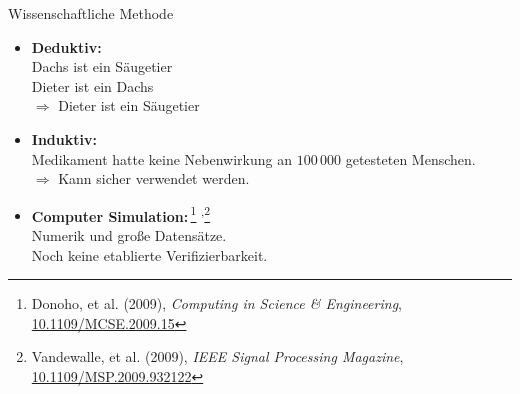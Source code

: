 \documentclass{beamer}
\begin{document}
\begin{frame}{Wissenschaftliche Methode}

    \begin{itemize}
        \item \textbf{Deduktiv:} \\
            \small{Dachs ist ein Säugetier\\%
                   Dieter ist ein Dachs\\%
                   $\Rightarrow$ Dieter ist ein Säugetier}
    \end{itemize}
    \begin{itemize}
        \item \textbf{Induktiv:} \\
            \small{Medikament hatte keine Nebenwirkung an $100\,000$ getesteten
                   Menschen.\\%
                   $\Rightarrow$ Kann sicher verwendet werden.}
    \end{itemize}
    \begin{itemize}
        \item \textbf{Computer Simulation:}\,\footnote{%
            Donoho, et al. (2009), \emph{Computing in Science \& Engineering},
            \href{https://doi.org/10.1109/MCSE.2009.15}{10.1109/MCSE.2009.15}}%
            \textsuperscript{,}\footnote{%
            Vandewalle, et al. (2009), \emph{IEEE Signal Processing Magazine},
            \href{https://doi.org/10.1109/MSP.2009.932122}{10.1109/MSP.2009.932122}}
            \\
            \small{Numerik und große Datensätze.\\
            Noch keine etablierte Verifizierbarkeit.}
    \end{itemize}

\end{frame}
\end{document}
